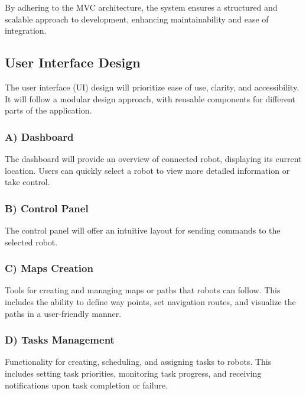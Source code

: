 By adhering to the MVC architecture, the system ensures a structured and scalable approach to development, enhancing maintainability and ease of integration.
\subsection{User Interface Design}
\vspace{-1.5mm}
The user interface (UI) design will prioritize ease of use, clarity, and accessibility. It will follow a modular design approach, with reusable components for different parts of the application.
\vspace{-1.5mm}
\newpage
\subsubsection{A) Dashboard}
\vspace{-1mm}
The dashboard will provide an overview of connected robot, displaying its current location. Users can quickly select a robot to view more detailed information or take control.
\vspace{-1mm}
\subsubsection{B) Control Panel}
\vspace{-1mm}
The control panel will offer an intuitive layout for sending commands to the selected robot.
\vspace{-5mm}
\subsubsection{C) Maps Creation}
\vspace{-1mm}
Tools for creating and managing maps or paths that robots can follow. This includes the ability to define way points, set navigation routes, and visualize the paths in a user-friendly manner.

\subsubsection{D) Tasks Management}
\vspace{-1mm}
 Functionality for creating, scheduling, and assigning tasks to robots. This includes setting task priorities, monitoring task progress, and receiving notifications upon task completion or failure.
\vspace{-1mm}
